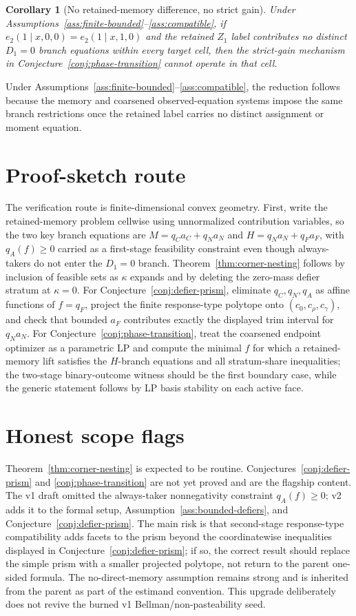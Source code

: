\documentclass[11pt]{article}
\theoremstyle{definition}
\theoremstyle{plain}
\newtheorem{corollary}{Corollary}
\theoremstyle{remark}
\begin{document}
\begin{corollary}[No retained-memory difference, no strict gain]\label{cor:no-memory-diff}
Under Assumptions~\ref{ass:finite-bounded}--\ref{ass:compatible}, if \(e_2(1\mid x,0,0)=e_2(1\mid x,1,0)\) and the retained \(Z_1\) label contributes no distinct \(D_1=0\) branch equations within every target cell, then the strict-gain mechanism in Conjecture~\ref{conj:phase-transition} cannot operate in that cell.
\end{corollary}
Under Assumptions~\ref{ass:finite-bounded}--\ref{ass:compatible}, the reduction follows because the memory and coarsened observed-equation systems impose the same branch restrictions once the retained label carries no distinct assignment or moment equation.

\section{Proof-sketch route}
The verification route is finite-dimensional convex geometry.  First, write the retained-memory problem cellwise using unnormalized contribution variables, so the two key branch equations are \(M=q_C a_C+q_N a_N\) and \(H=q_N a_N+q_F a_F\), with \(q_A(f)\ge0\) carried as a first-stage feasibility constraint even though always-takers do not enter the \(D_1=0\) branch.  Theorem~\ref{thm:corner-nesting} follows by inclusion of feasible sets as \(\kappa\) expands and by deleting the zero-mass defier stratum at \(\kappa=0\).  For Conjecture~\ref{conj:defier-prism}, eliminate \(q_C,q_N,q_A\) as affine functions of \(f=q_F\), project the finite response-type polytope onto \((c_0,c_\rho,c_\gamma)\), and check that bounded \(a_F\) contributes exactly the displayed trim interval for \(q_Na_N\).  For Conjecture~\ref{conj:phase-transition}, treat the coarsened endpoint optimizer as a parametric LP and compute the minimal \(f\) for which a retained-memory lift satisfies the \(H\)-branch equations and all stratum-share inequalities; the two-stage binary-outcome witness should be the first boundary case, while the generic statement follows by LP basis stability on each active face.

\section{Honest scope flags}
Theorem~\ref{thm:corner-nesting} is expected to be routine.  Conjectures~\ref{conj:defier-prism} and \ref{conj:phase-transition} are not yet proved and are the flagship content.  The v1 draft omitted the always-taker nonnegativity constraint \(q_A(f)\ge0\); v2 adds it to the formal setup, Assumption~\ref{ass:bounded-defiers}, and Conjecture~\ref{conj:defier-prism}.  The main risk is that second-stage response-type compatibility adds facets to the prism beyond the coordinatewise inequalities displayed in Conjecture~\ref{conj:defier-prism}; if so, the correct result should replace the simple prism with a smaller projected polytope, not return to the parent one-sided formula.  The no-direct-memory assumption remains strong and is inherited from the parent as part of the estimand convention.  This upgrade deliberately does not revive the burned v1 Bellman/non-pasteability seed.
\end{document}
